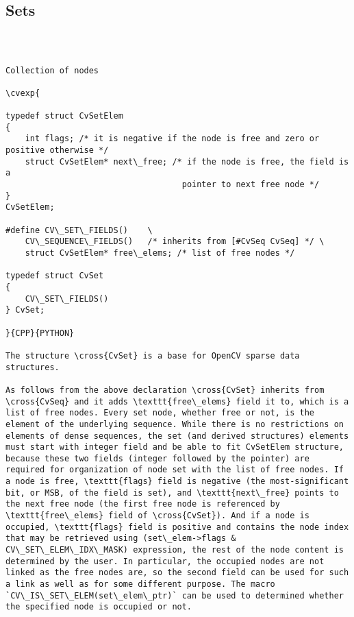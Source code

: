 \subsection{Sets}
\begin{verbatim}


\end{verbatim}
\begin{verbatim}

Collection of nodes

\cvexp{

typedef struct CvSetElem
{
    int flags; /* it is negative if the node is free and zero or positive otherwise */
    struct CvSetElem* next\_free; /* if the node is free, the field is a
                                    pointer to next free node */
}
CvSetElem;

#define CV\_SET\_FIELDS()    \
    CV\_SEQUENCE\_FIELDS()   /* inherits from [#CvSeq CvSeq] */ \
    struct CvSetElem* free\_elems; /* list of free nodes */

typedef struct CvSet
{
    CV\_SET\_FIELDS()
} CvSet;

}{CPP}{PYTHON}

The structure \cross{CvSet} is a base for OpenCV sparse data structures.

As follows from the above declaration \cross{CvSet} inherits from \cross{CvSeq} and it adds \texttt{free\_elems} field it to, which is a list of free nodes. Every set node, whether free or not, is the element of the underlying sequence. While there is no restrictions on elements of dense sequences, the set (and derived structures) elements must start with integer field and be able to fit CvSetElem structure, because these two fields (integer followed by the pointer) are required for organization of node set with the list of free nodes. If a node is free, \texttt{flags} field is negative (the most-significant bit, or MSB, of the field is set), and \texttt{next\_free} points to the next free node (the first free node is referenced by \texttt{free\_elems} field of \cross{CvSet}). And if a node is occupied, \texttt{flags} field is positive and contains the node index that may be retrieved using (set\_elem->flags & CV\_SET\_ELEM\_IDX\_MASK) expression, the rest of the node content is determined by the user. In particular, the occupied nodes are not linked as the free nodes are, so the second field can be used for such a link as well as for some different purpose. The macro `CV\_IS\_SET\_ELEM(set\_elem\_ptr)` can be used to determined whether the specified node is occupied or not.


\end{verbatim}
